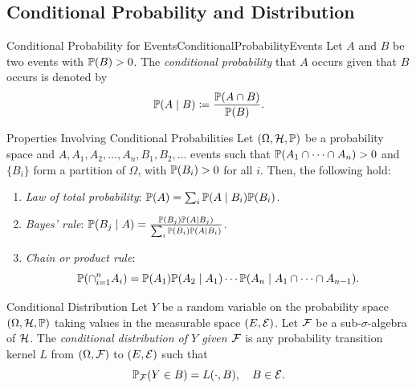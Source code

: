 \subsection{Conditional Probability and Distribution}

\begin{defn}{Conditional Probability for Events}{ConditionalProbabilityEvents}
Let \(A\) and \(B\) be two events with \(\mathbb{P}(B) > 0\). The \textit{conditional probability} that \(A\) occurs given that \(B\) occurs is denoted by
\begin{equation}
    \mathbb{P}(A \mid B) \coloneqq \frac{\mathbb{P}(A \cap B)}{\mathbb{P}(B)}.
    \label{eq:ConditionalProbabilityDef}
\end{equation}
\end{defn}

\begin{thm}{Properties Involving Conditional Probabilities}{}
Let \((\Omega, \mathcal{H}, \mathbb{P})\) be a probability space and \(A, A_1, A_2, \dots, A_n, B_1, B_2, \dots\) events such that \(\mathbb{P}(A_1 \cap \dots \cap A_n) > 0\) and \(\{B_i\}\) form a partition of \(\Omega\), with \(\mathbb{P}(B_i) > 0\) for all \(i\). Then, the following hold:
\begin{enumerate}
    \item \textit{Law of total probability}: \(\mathbb{P}(A) = \sum_i \mathbb{P}(A \mid B_i) \mathbb{P}(B_i)\).
    \item \textit{Bayes' rule}: \(\mathbb{P}(B_j \mid A) = \frac{\mathbb{P}(B_j) \mathbb{P}(A \mid B_j)}{\sum_i \mathbb{P}(B_i) \mathbb{P}(A \mid B_i)}\).
    \item \textit{Chain or product rule}:
    \begin{equation*}
        \mathbb{P}(\cap_{i=1}^n A_i) = \mathbb{P}(A_1) \mathbb{P}(A_2 \mid A_1) \cdots \mathbb{P}(A_n \mid A_1 \cap \dots \cap A_{n-1}).
    \end{equation*}
\end{enumerate}
\end{thm}

\begin{defn}{Conditional Distribution}{}
Let \(Y\) be a random variable on the probability space \((\Omega, \mathcal{H}, \mathbb{P})\) taking values in the measurable space \((E, \mathcal{E})\). Let \(\mathcal{F}\) be a sub-\(\sigma\)-algebra of \(\mathcal{H}\). The \textit{conditional distribution of \(Y\) given \(\mathcal{F}\)} is any probability transition kernel \(L\) from \((\Omega, \mathcal{F})\) to \((E, \mathcal{E})\) such that
\begin{equation}
    \mathbb{P}_{\mathcal{F}}(Y \in B) = L(\cdot, B), \quad B \in \mathcal{E}.
    \label{eq:ConditionalDistributionDef}
\end{equation}
\end{defn}

